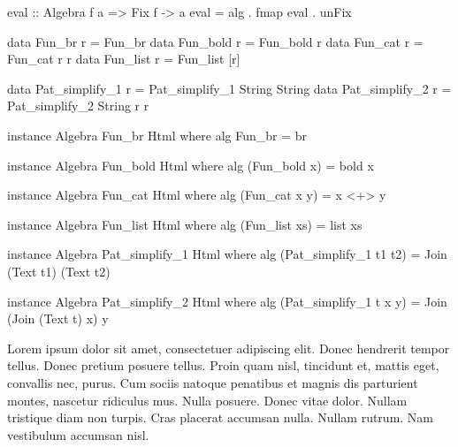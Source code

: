 \begin{code}
eval :: Algebra f a => Fix f -> a
eval = alg . fmap eval . unFix
\end{code}


\begin{code}
data Fun_br     r = Fun_br
data Fun_bold   r = Fun_bold r
data Fun_cat    r = Fun_cat r r
data Fun_list   r = Fun_list [r]
\end{code}

\begin{code}
data Pat_simplify_1 r = Pat_simplify_1 String String
data Pat_simplify_2 r = Pat_simplify_2 String r r
\end{code}

\begin{code}
instance Algebra Fun_br Html where
  alg Fun_br = br

instance Algebra Fun_bold Html where
  alg (Fun_bold x) = bold x

instance Algebra Fun_cat Html where
  alg (Fun_cat x y) = x <+> y

instance Algebra Fun_list Html where
  alg (Fun_list xs) = list xs
\end{code}

\begin{code}
instance Algebra Pat_simplify_1 Html where
  alg (Pat_simplify_1 t1 t2) = Join (Text t1) (Text t2)

instance Algebra Pat_simplify_2 Html where
  alg (Pat_simplify_1 t x y) = Join (Join (Text t) x) y
\end{code}


Lorem ipsum dolor sit amet, consectetuer adipiscing elit. Donec hendrerit tempor
tellus. Donec pretium posuere tellus. Proin quam nisl, tincidunt et, mattis
eget, convallis nec, purus. Cum sociis natoque penatibus et magnis dis
parturient montes, nascetur ridiculus mus. Nulla posuere. Donec vitae dolor.
Nullam tristique diam non turpis. Cras placerat accumsan nulla. Nullam rutrum.
Nam vestibulum accumsan nisl\cite{godefroid2005dart}.
